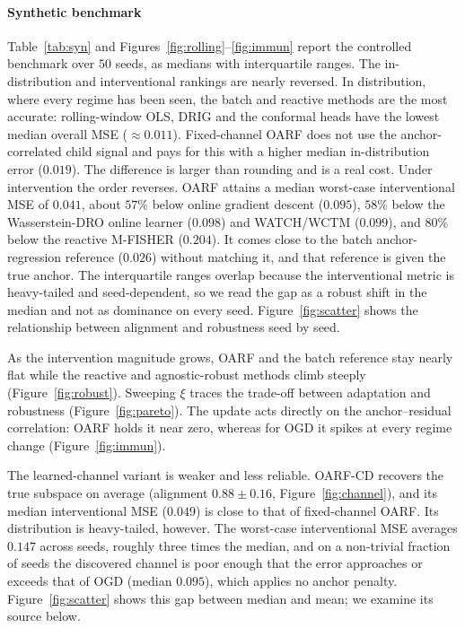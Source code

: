 \documentclass[authoryear,preprint,12pt]{elsarticle}
\theoremstyle{plain}
\theoremstyle{remark}
\newcommand{\OARF}{\textsc{OARF}}
\newcommand{\OARFCD}{\textsc{OARF-CD}}
\begin{document}
\paragraph{Synthetic benchmark}
Table~\ref{tab:syn} and Figures~\ref{fig:rolling}--\ref{fig:immun} report the controlled
benchmark over $50$ seeds, as medians with interquartile ranges. The in-distribution and
interventional rankings are nearly reversed. In distribution, where every regime has been
seen, the batch and reactive methods are the most accurate: rolling-window OLS, DRIG and
the conformal heads have the lowest median overall MSE ($\approx 0.011$). Fixed-channel
\OARF{} does not use the anchor-correlated child signal and pays for this with a higher
median in-distribution error ($0.019$). The difference is larger than rounding and is a
real cost. Under intervention the order reverses. \OARF{} attains a median
worst-case interventional MSE of $0.041$, about $57\%$ below online gradient descent
($0.095$), $58\%$ below the Wasserstein-DRO online learner ($0.098$) and WATCH/WCTM
($0.099$), and $80\%$ below the reactive M-FISHER ($0.204$). It comes close to the batch
anchor-regression reference ($0.026$) without matching it, and that reference is given the
true anchor. The interquartile ranges overlap because the interventional metric is
heavy-tailed and seed-dependent, so we read the gap as a robust shift in the median and not
as dominance on every seed. Figure~\ref{fig:scatter} shows the relationship between
alignment and robustness seed by seed.

As the intervention magnitude grows, \OARF{} and the batch reference stay nearly flat while
the reactive and agnostic-robust methods climb steeply (Figure~\ref{fig:robust}). Sweeping
$\xi$ traces the trade-off between adaptation and robustness (Figure~\ref{fig:pareto}). The
update acts directly on the anchor--residual correlation: \OARF{} holds it near zero,
whereas for OGD it spikes at every regime change (Figure~\ref{fig:immun}).

The learned-channel variant is weaker and less reliable. \OARFCD{} recovers the true
subspace on average (alignment $0.88\pm0.16$, Figure~\ref{fig:channel}), and its median
interventional MSE ($0.049$) is close to that of fixed-channel \OARF{}. Its distribution is
heavy-tailed, however. The worst-case interventional MSE averages $0.147$ across seeds,
roughly three times the median, and on a non-trivial fraction of seeds the discovered
channel is poor enough that the error approaches or exceeds that of OGD (median $0.095$),
which applies no anchor penalty. Figure~\ref{fig:scatter} shows this gap between median and
mean; we examine its source below.
\end{document}
